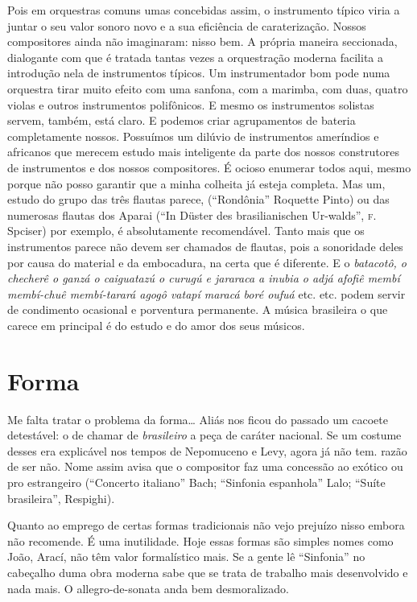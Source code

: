 Pois em orquestras comuns umas concebidas assim, o instrumento típico
viria a juntar o seu valor sonoro novo e a sua eficiência de
caraterização. Nossos compositores ainda não imaginaram: nisso bem. A
própria maneira seccionada, dialogante com que é tratada tantas vezes a
orquestração moderna facilita a introdução nela de instrumentos típicos.
Um instrumentador bom pode numa orquestra tirar muito efeito com uma
sanfona, com a marimba, com duas, quatro violas e outros instrumentos
polifônicos. E mesmo os instrumentos solistas servem, também, está
claro. E podemos criar agrupamentos de bateria completamente nossos.
Possuímos um dilúvio de instrumentos ameríndios e africanos que merecem
estudo mais inteligente da parte dos nossos construtores de instrumentos
e dos nossos compositores. É ocioso enumerar todos aqui, mesmo porque
não posso garantir que a minha colheita já esteja completa. Mas um,
estudo do grupo das três flautas parece, (``Rondônia'' Roquette Pinto) ou
das numerosas flautas dos Aparai (``In Düster des brasilianischen
Ur-walds'', \textsc{f}.\,Spciser) por exemplo, é absolutamente recomendável. Tanto
mais que os instrumentos parece não devem ser chamados de flautas, pois
a sonoridade deles por causa do material e da embocadura, na certa que é
diferente. E o \textit{batacotô, o checherê o ganzá o caiguatazú o curugú e
jararaca a inubia o adjá afofiê membí membí-chuê membí-tarará agogô
vatapí maracá boré oufuá} etc. etc. podem servir de condimento ocasional
e porventura permanente. A música brasileira o que carece em principal é
do estudo e do amor dos seus músicos.

\section{Forma}

Me falta tratar o problema da forma\ldots{} Aliás nos ficou do passado um
cacoete detestável: o de chamar de \emph{brasileiro} a peça de caráter
nacional. Se um costume desses era explicável nos tempos de Nepomuceno e
Levy, agora já não tem. razão de ser não. Nome assim avisa que o
compositor faz uma concessão ao exótico ou pro estrangeiro (``Concerto
italiano'' Bach; ``Sinfonia espanhola'' Lalo; ``Suíte brasileira'',
Respighi).

Quanto ao emprego de certas formas tradicionais não vejo prejuízo nisso
embora não recomende. É uma inutilidade. Hoje essas formas são simples
nomes como João, Arací, não têm valor formalístico mais. Se a gente lê
``Sinfonia'' no cabeçalho duma obra moderna sabe que se trata de trabalho
mais desenvolvido e nada mais. O allegro-de-sonata anda bem
desmoralizado.

